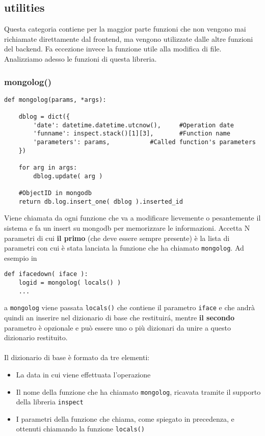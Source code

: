 \documentclass[11pt]{article}
\begin{document}
\subsection{utilities}
Questa categoria contiene per la maggior parte funzioni che non vengono mai richiamate direttamente dal frontend, ma vengono utilizzate
dalle altre funzioni del backend. Fa eccezione invece la funzione  utile alla modifica di file. \\
Analizziamo adesso le funzioni di questa libreria.
\subsubsection{mongolog()}\label{mongolog}
\begin{lstlisting}
def mongolog(params, *args):

    dblog = dict({
    	'date': datetime.datetime.utcnow(),     #Operation date
    	'funname': inspect.stack()[1][3],       #Function name
    	'parameters': params,			#Called function's parameters
    })
    
    for arg in args:
        dblog.update( arg )

    #ObjectID in mongodb
    return db.log.insert_one( dblog ).inserted_id
\end{lstlisting}
Viene chiamata da ogni funzione che va a modificare lievemente o pesantemente il sistema e fa un insert su mongodb per memorizzare le informazioni.
Accetta N parametri di cui \textbf{il primo} (che deve essere sempre presente) è la lista di parametri
con cui è stata lanciata la funzione che ha chiamato \texttt{mongolog}. Ad esempio in
\begin{lstlisting}
def ifacedown( iface ):
	logid = mongolog( locals() )
	...
\end{lstlisting}
a \texttt{mongolog} viene passata \texttt{locals()} che contiene il parametro \texttt{iface} e che andrà quindi an inserire nel dizionario
di base che restituir\'a, mentre \textbf{il secondo} parametro è opzionale e può essere uno o più dizionari da unire a questo dizionario restituito.
\\~\\
Il dizionario di base è formato da tre elementi:
\begin{itemize}
	\item{La data in cui viene effettuata l'operazione}
	\item{Il nome della funzione che ha chiamato \texttt{mongolog}, ricavata tramite il supporto della libreria \texttt{inspect}}
	\item{I parametri della funzione che chiama, come spiegato in precedenza, e ottenuti chiamando la funzione \texttt{locals()}}
\end{itemize}
\end{document}
